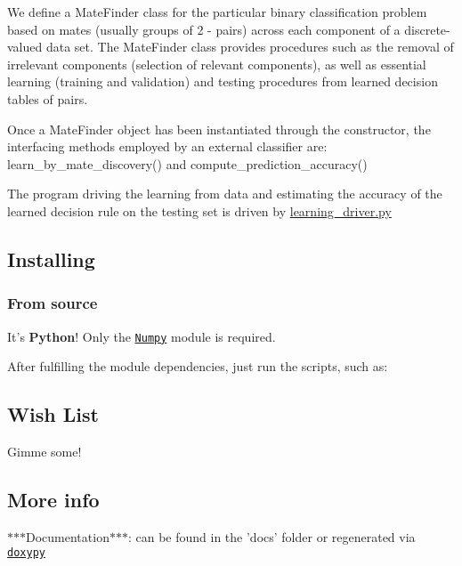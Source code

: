 We define a {\ttfamily Mate\+Finder} class for the particular binary classification problem based on mates (usually groups of 2 -\/ pairs) across each component of a discrete-\/valued data set. The {\ttfamily Mate\+Finder} class provides procedures such as the removal of irrelevant components (selection of relevant components), as well as essential learning (training and validation) and testing procedures from learned decision tables of pairs.

Once a {\ttfamily Mate\+Finder} object has been instantiated through the constructor, the interfacing methods employed by an external classifier are\+: {\ttfamily learn\+\_\+by\+\_\+mate\+\_\+discovery()} and {\ttfamily compute\+\_\+prediction\+\_\+accuracy()}

The program driving the learning from data and estimating the accuracy of the learned decision rule on the testing set is driven by {\ttfamily \hyperlink{learning__driver_8py}{learning\+\_\+driver.\+py}}

\subsection*{Installing}

\subsubsection*{From source}

It's {\bfseries Python}! Only the \href{http://numpy.org}{\tt Numpy} module is required.

After fulfilling the module dependencies, just run the scripts, such as\+: 


\subsection*{Wish List}


\begin{DoxyItemize}
\item Gimme some!
\end{DoxyItemize}

\subsection*{More info}

$\ast$$\ast$$\ast$\+Documentation$\ast$$\ast$$\ast$\+: can be found in the 'docs' folder or regenerated via \href{http://code.foosel.org/doxypy}{\tt doxypy} 